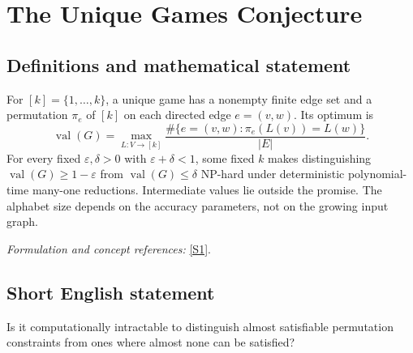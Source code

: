 \documentclass[11pt,a4paper]{article}
\newcommand{\sref}[2]{\hyperlink{source:#1:#2}{[S#2]}}
\newif\ifshowcatalogue
\newcommand{\cataloguescope}[1]{\ifshowcatalogue
 \paragraph{Exact scope in the supplied catalogue.}
 \begin{quote}\small #1\end{quote}\fi}
\numberwithin{equation}{section}
\begin{document}
\setcounter{section}{0}
\clearpage
\section*{\texorpdfstring{The Unique Games Conjecture}{The Unique Games Conjecture}}\label{43}
\subsection{Definitions and mathematical statement}
For $[k]=\{1,\ldots,k\}$, a unique game has a nonempty finite edge set and a permutation $\pi_e$ of $[k]$ on each directed edge $e=(v,w)$. Its optimum is
\[
 \operatorname{val}(G)=\max_{L:V\to[k]}\frac{\#\{e=(v,w):\pi_e(L(v))=L(w)\}}{|E|}.
\]
For every fixed $\varepsilon,\delta>0$ with $\varepsilon+\delta<1$, some fixed $k$ makes distinguishing $\operatorname{val}(G)\ge1-\varepsilon$ from $\operatorname{val}(G)\le\delta$ NP-hard under deterministic polynomial-time many-one reductions. Intermediate values lie outside the promise. The alphabet size depends on the accuracy parameters, not on the growing input graph.
\par\smallskip\textit{Formulation and concept references:} \sref{43}{1}.
\cataloguescope{For every fixed pair of real constants epsilon, delta > 0 with epsilon + delta < 1, there exists an integer k >= 2, depending only on epsilon and delta, such that the following promise problem is NP-hard under deterministic polynomial-time many-one reductions. An instance is a finite directed constraint graph G=(V,E) with E nonempty and, for each edge e=(v,w), a permutation pi\_e of [k]. For a labeling L:V->[k], an edge is satisfied if pi\_e(L(v))=L(w); val(G) is the largest fraction of satisfied edges over all labelings. Distinguish val(G) >= 1-epsilon from val(G) <= delta, with no requirement on instances between these thresholds. The graph is the growing input; epsilon, delta and k are fixed constants. NP-hardness means that every language in NP has such a reduction mapping yes inputs to the first promised set and no inputs to the second.}
\subsection{Short English statement}
Is it computationally intractable to distinguish almost satisfiable permutation constraints from ones where almost none can be satisfied?
\end{document}
